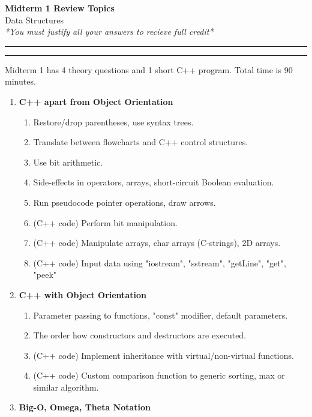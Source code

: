 \documentclass[a4paper,12pt]{article}
\begin{document}
\begin{center}
{\bf\Huge Midterm 1 Review Topics} \\[5pt]
Data Structures \\
\textit{*You must justify all your answers to recieve full credit*}
\end{center}

\hrule
\vspace{2pt}
\hrule
\vspace{12pt}

Midterm 1 has 4 theory questions and 1 short C++ program.
Total time is 90 minutes. 

{\small
\begin{enumerate}

\item \textbf{C++ apart from Object Orientation}
\begin{enumerate}[label=1.\Alph*.]
\item Restore/drop parentheses, use syntax trees.
\item Translate between flowcharts and C++ control structures. 
\item Use bit arithmetic.
\item Side-effects in operators, arrays, short-circuit Boolean evaluation.
\item Run pseudocode pointer operations, draw arrows.
\item (C++ code) Perform bit manipulation.
\item (C++ code) Manipulate arrays, char arrays (C-strings), 2D arrays.
\item (C++ code) Input data using "iostream", "sstream", "getLine", "get", "peek"
\end{enumerate}
\item \textbf{C++ with Object Orientation} 
\begin{enumerate}[label=2.\Alph*.]
\item Parameter passing to functions, "const" modifier, default parameters.
\item The order how constructors and destructors are executed.
\item (C++ code) Implement inheritance with virtual/non-virtual functions.
\item (C++ code) Custom comparison function to generic sorting, max or similar algorithm.
\end{enumerate}
\item \textbf{Big-O, Omega, Theta Notation} 
\begin{enumerate}[label=3.\Alph*.]

\end{enumerate}
\end{enumerate}}
\end{document}
